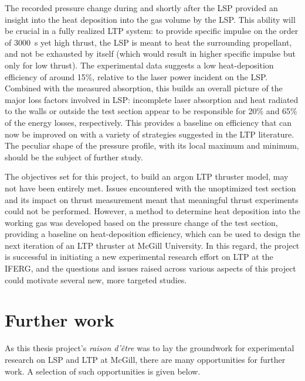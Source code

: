     The recorded pressure change during and shortly after the LSP provided an insight into the heat deposition into the gas volume by the LSP. This ability will be crucial in a fully realized LTP system: to provide specific impulse on the order of \qty{3000}{s} yet high thrust, the LSP is meant to heat the surrounding propellant, and not be exhausted by itself (which would result in higher specific impulse but only for low thrust). The experimental data suggests a low heat-deposition efficiency of around 15\%, relative to the laser power incident on the LSP. Combined with the measured absorption, this builds an overall picture of the major loss factors involved in LSP: incomplete laser absorption and heat radiated to the walls or outside the test section appear to be responsible for 20\% and 65\% of the energy losses, respectively. This provides a baseline on efficiency that can now be improved on with a variety of strategies suggested in the LTP literature. The peculiar shape of the pressure profile, with its local maximum and minimum, should be the subject of further study.

    The objectives set for this project, to build an argon LTP thruster model, may not have been entirely met. Issues encountered with the unoptimized test section and its impact on thrust measurement meant that meaningful thrust experiments could not be performed. However, a method to determine heat deposition into the working gas was developed based on the pressure change of the test section, providing a baseline on heat-deposition efficiency, which can be used to design the next iteration of an LTP thruster at McGill University. In this regard, the project is successful in initiating a new experimental research effort on LTP at the IFERG, and the questions and issues raised across various aspects of this project could motivate several new, more targeted studies.

    \section{Further work}
        As this thesis project's \emph{raison d'être} was to lay the groundwork for experimental research on LSP and LTP at McGill, there are many opportunities for further work. A selection of such opportunities is given below.

